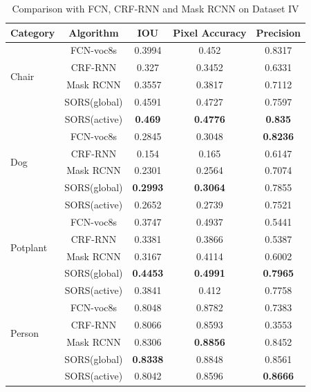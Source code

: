 \documentclass[conference]{IEEEtran}
\begin{document}
 \begin{table}[htbp]
	\centering
	\normalsize
	\caption{ {\color{blue}Comparison with FCN, CRF-RNN and Mask RCNN on Dataset IV}}
	\label{t5}
	\begin{tabular}{lcccc}
		\hline
		Category& Algorithm& IOU& Pixel Accuracy& Precision \\
		\hline
		\multirow {4}{3cm}{Chair}&FCN-voc8s&0.3994&0.452&0.8317\\
		
		&CRF-RNN&0.327&0.3452&0.6331\\
		&{\color{blue}Mask RCNN}&{\color{blue}0.3557}&{\color{blue}0.3817} &{\color{blue} 0.7112}  \\
		&SORS(global)&0.4591&0.4727&0.7597\\
		
		&SORS(active)&\textbf{0.469}&\textbf{0.4776}&\textbf{0.835}\\
		\cline{1-5}
		\multirow {4}{3cm}{Dog}&FCN-voc8s&0.2845&0.3048&\textbf{0.8236}\\
		
		&CRF-RNN&0.154&0.165&0.6147\\
		&{\color{blue}Mask RCNN}&{\color{blue}0.2301}&{\color{blue} 0.2564} &{\color{blue} 0.7074}  \\
		&SORS(global)&\textbf{0.2993}&\textbf{0.3064}&0.7855\\
		
		&SORS(active)&0.2652&0.2739&0.7521\\
		\cline{1-5}
		\multirow {4}{3cm}{Potplant}&FCN-voc8s&0.3747&0.4937&0.5441\\
		
		&CRF-RNN&0.3381&0.3866&0.5387\\
		&{\color{blue}Mask RCNN}&{\color{blue}0.3167}&{\color{blue} 0.4114} &{\color{blue} 0.6002}  \\
		&SORS(global)&\textbf{0.4453}&\textbf{0.4991}&\textbf{0.7965}\\
		
		&SORS(active)&0.3841&0.412&0.7758\\
		\cline{1-5}
		\multirow {4}{3cm}{Person}&FCN-voc8s&0.8048&0.8782&0.7383\\
		
		&CRF-RNN&0.8066&0.8593&0.3553\\
		&{\color{blue}Mask RCNN}&{\color{blue}0.8306}&{\color{blue}\textbf{0.8856}} &{\color{blue} 0.8452}  \\
		
		&SORS(global)&\textbf{0.8338}&0.8848&0.8561\\
		
		&SORS(active)&0.8042&0.8596&\textbf{0.8666}\\
		\cline{1-5}
	\end{tabular}	
\end{table} 
\end{document}
